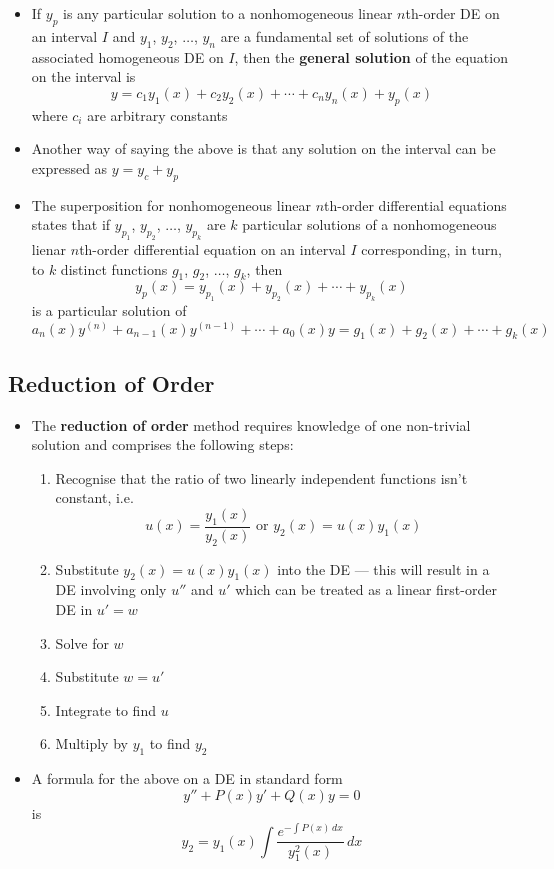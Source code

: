 \documentclass{article}
\begin{document}
\begin{itemize}
  \item If $y_p$ is any particular solution to a nonhomogeneous linear $n$th-order DE on an interval $I$ and $y_1$, $y_2$, $\ldots$, $y_n$ are a fundamental set of solutions of the associated homogeneous DE on $I$, then the \textbf{general solution} of the equation on the interval is \[y = c_1 y_1(x) + c_2 y_2(x) + \cdots + c_n y_n(x) + y_p(x)\] where $c_i$ are arbitrary constants

  \item Another way of saying the above is that any solution on the interval can be expressed as $y = y_c + y_p$

  \item The superposition for nonhomogeneous linear $n$th-order differential equations states that if $y_{p_1}$, $y_{p_2}$, $\ldots$, $y_{p_k}$ are $k$ particular solutions of a nonhomogeneous lienar $n$th-order differential equation on an interval $I$ corresponding, in turn, to $k$ distinct functions $g_1$, $g_2$, $\ldots$, $g_k$, then \[y_p(x) = y_{p_1}(x) + y_{p_2}(x) + \cdots + y_{p_k}(x)\] is a particular solution of \[a_n(x) y^{(n)} + a_{n - 1}(x) y^{(n - 1)} + \cdots + a_0(x) y = g_1(x) + g_2(x) + \cdots + g_k(x)\]
\end{itemize}

\subsection{Reduction of Order}

\begin{itemize}
  \item The \textbf{reduction of order} method requires knowledge of one non-trivial solution and comprises the following steps:

        \begin{enumerate}
          \item Recognise that the ratio of two linearly independent functions isn't constant, i.e. \[u(x) = \frac{y_1(x)}{y_2(x)} \text{ or } y_2(x) = u(x) y_1(x)\]

          \item Substitute $y_2(x) = u(x) y_1(x)$ into the DE — this will result in a DE involving only $u''$ and $u'$ which can be treated as a linear first-order DE in $u' = w$

          \item Solve for $w$

          \item Substitute $w = u'$

          \item Integrate to find $u$

          \item Multiply by $y_1$ to find $y_2$
        \end{enumerate}

  \item A formula for the above on a DE in standard form \[y'' + P(x) y' + Q(x) y = 0\] is \[y_2 = y_1(x) \int \frac{e^{-\int P(x) \,dx}}{y_1^2(x)} \,dx\]
\end{itemize}
\end{document}
